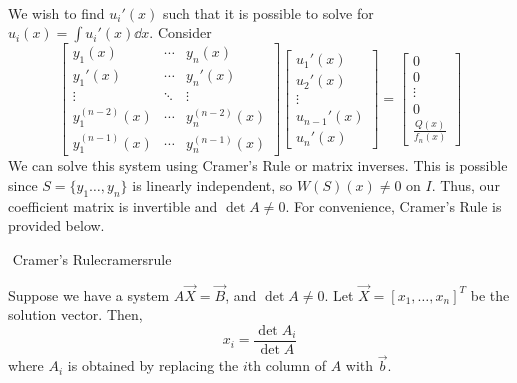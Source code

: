         \\
        We wish to find \(u_i'(x)\) such that it is possible to solve for \(u_i(x)=\int u_i'(x)\dd x\). Consider
        \begin{equation*}
            \begin{bmatrix}
                    y_1(x) & \cdots & y_n(x) \\
                    y_1'(x) & \cdots & y_n'(x) \\
                    \vdots & \ddots & \vdots \\
                    y_1^{(n-2)}(x) & \cdots & y_n^{(n-2)}(x) \\
                    y_1^{(n-1)}(x) & \cdots & y_n^{(n-1)}(x)
            \end{bmatrix}
            \begin{bmatrix}
                u_1'(x) \\ u_2'(x) \\ \vdots \\ u_{n-1}'(x) \\ u_n'(x) 
            \end{bmatrix}
            =
            \begin{bmatrix}
                0 \\ 0 \\ \vdots \\ 0 \\ \frac{Q(x)}{f_n(x)}
            \end{bmatrix}
        \end{equation*}
        We can solve this system using Cramer's Rule or matrix inverses. This is possible since \(S=\{y_1\ldots,y_n\}\) is linearly independent, so \(W(S)(x)\neq0\) on \(I\). Thus, our coefficient matrix is invertible and \(\det A\neq0\). For convenience, Cramer's Rule is provided below.
        \begin{theorem}{\Stop\,\,Cramer's Rule}{cramersrule}

            Suppose we have a system \(A\vec{X}=\vec{B}\), and \(\det A\neq0\). Let \(\vec{X}=[x_1,\ldots,x_n]^T\) be the solution vector. Then,
            \begin{equation*}
                x_i=\frac{\det A_i}{\det A}
            \end{equation*}
            where \(A_i\) is obtained by replacing the \(i\)th column of \(A\) with \(\vec{b}\).
            
        \end{theorem}
        \pagebreak
        \vphantom
